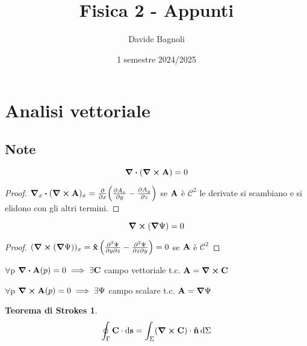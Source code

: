 \documentclass[12pt,a4paper]{article}
\title{Fisica 2 - Appunti}
\author{Davide Bagnoli}
\date{1 semestre 2024/2025}
\begin{document}
\maketitle
\tableofcontents
\newpage

\section{Analisi vettoriale}
\subsection{Note}
\begin{proposition}
    \begin{equation*}
    \div(\curl \vb{A})= 0
    \end{equation*}
\end{proposition}
\begin{proof}
$
\grad_{x}\vdot(\curl{\vb{A}})_{x}=\pdv{x}(\pdv{A_z}{y}-\pdv{A_y}{z})$
se $\vb{A}$ è $\mathcal{C}^{2}$ le derivate si scambiano e si elidono con gli altri termini.
\end{proof}

\begin{proposition}
    \begin{equation*}
    \curl(\grad \Psi)=0
    \end{equation*}
\end{proposition}

\begin{proof}
 $(\curl(\grad\Psi))_{x} = \vu{x}\left( \pdv{\Psi}{y}{z} -\pdv{\Psi}{z}{y}\right)=0$ se $\vb{A}$ è $\mathcal{C}^{2}$   
\end{proof}

\begin{theorem}
    $\forall$p $\div \vb{A}(p)= 0 \implies \exists\vb{C} $ campo vettoriale t.c. $\vb{A} = \curl \vb{C}$
\end{theorem}

\begin{theorem}
    $\forall$p $\curl \vb{A}(p)= 0 \implies \exists\Psi $ campo scalare t.c. $\vb{A} = \grad \Psi$
\end{theorem}

\newtheorem*{TS}{Teorema di Strokes}
\begin{TS}
    \begin{equation*}
    \oint_{\Gamma}\vb{C}\cdot \dd{\vb{s}}= \int_{\Sigma}(\curl \vb{C})\cdot \vu{n} \dd{\Sigma}
    \end{equation*}
\end{TS}
\end{document}
